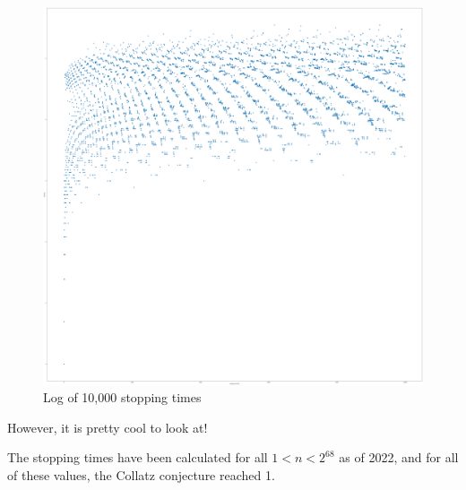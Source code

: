 \documentclass{article}
\theoremstyle{remark}
\theoremstyle{problem}
\numberwithin{problem}{subsection}
\numberwithin{Problem}{section}
\theoremstyle{definition}
\theoremstyle{definition}
\theoremstyle{definition}
\begin{document}
\begin{figure}
\centering
\includegraphics[width = 0.5 \textwidth]{images/10,000 log.png}
\caption{\label{fig:img3} Log of 10,000 stopping times}
\end{figure}

However, it is pretty cool to look at! 

The stopping times have been calculated for all $1 < n < 2^{68}$ as of 2022, and for all of these values, the Collatz conjecture reached 1. 
\end{document}
